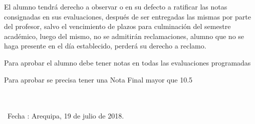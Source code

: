 \documentclass[a4paper,8pt]{article}
\begin{document}
\begin{requisitosAprobacion}
\item El alumno tendrá derecho a observar o en su defecto a ratificar las notas consignadas en sus evaluaciones, después de ser entregadas las mismas por parte del profesor, salvo el vencimiento de plazos para culminación del semestre académico, luego del mismo, no se admitirán reclamaciones,
alumno que no se haga presente en el día establecido, perderá su derecho a reclamo.
\item Para aprobar el alumno debe tener notas en todas las evaluaciones programadas  
\item Para aprobar se precisa tener una Nota Final mayor que 10.5
\end{requisitosAprobacion}




\\
\\ 
\ Fecha : Arequipa, 19 de julio de 2018.
\firma
\end{document}
